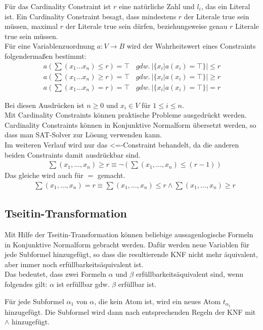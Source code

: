 \documentclass[a4,abstract=on]{scrartcl}
\begin{document}
Für das Cardinality Constraint ist $r$ eine natürliche Zahl und $l_i$, das ein Literal ist. Ein Cardinality Constraint besagt, dass mindestens $r$ der Literale true sein müssen, maximal $r$ der Literale true sein dürfen, beziehungsweise genau $r$ Literale true sein müssen.\\
Für eine Variablenzuordnung $a:V \rightarrow B$ wird der Wahrheitswert eines Constraints folgendermaßen bestimmt:
\begin{align*}
a(\sum(x_1 \dots x_n ) \leq r) = \top {~~~~} gdw. {~} |\{x_i|a(x_i) = \top\}| \leq r \\
a(\sum(x_1 \dots x_n ) \geq r) = \top {~~~~} gdw. {~} |\{x_i|a(x_i) = \top\}| \geq r \\
a(\sum(x_1 \dots x_n ) = r) = \top {~~~~} gdw. {~} |\{x_i|a(x_i) = \top\}| = r 
\end{align*}

Bei diesen Ausdrücken ist $n\geq 0$ und $x_i \in V$ für $1 \leq i \leq n$.\\
Mit Cardinality Constraints können praktische Probleme ausgedrückt werden. Cardinality Constraints können in Konjunktive Normalform übersetzt werden, so dass man SAT-Solver zur Lösung verwenden kann.\\
Im weiteren Verlauf wird nur das <=-Constraint behandelt, da die anderen beiden Constraints damit ausdrückbar sind.
\begin{align*}
&\sum (x_1, \dots, x_n) \geq r \equiv \neg (\sum (x_1, \dots, x_n) \leq (r-1))
\end{align*}
Das gleiche wird auch für $=$ gemacht.
\begin{align*}
&\sum(x_1, \dots, x_n) = r \equiv \sum(x_1, \dots, x_n) \leq r \wedge \sum(x_1, \dots, x_n) \geq r
\end{align*}


\subsection{Tseitin-Transformation}
Mit Hilfe der Tseitin-Transformation können beliebige aussagenlogische Formeln in Konjunktive Normalform gebracht werden. Dafür werden neue Variablen für jede Subformel hinzugefügt, so dass die resultierende KNF nicht mehr äquivalent, aber immer noch erfüllbarkeitsäquivalent ist. \\
Das bedeutet, dass zwei Formeln $\alpha$ und $\beta$ erfüllbarkeitsäquivalent sind, wenn folgendes gilt:
$\alpha$ ist erfüllbar gdw. $\beta$ erfüllbar ist.

Für jede Subformel $\alpha_1$ von $\alpha$, die kein Atom ist, wird ein neues Atom $t_{\alpha_1}$ hinzugefügt. Die Subformel wird dann nach entsprechenden Regeln der KNF mit $\wedge$ hinzugefügt.\\
\end{document}
